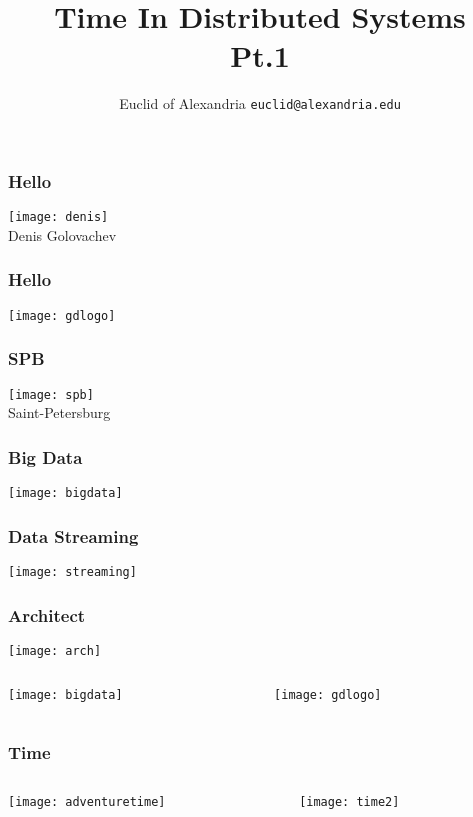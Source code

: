 \documentclass[aspectratio=169, 15pt,usenames,dvipsnames]{beamer}
\title{Time In Distributed Systems\\Pt.1}
\author[Euclid]{Euclid of Alexandria \texttt{euclid@alexandria.edu}}
\begin{document}
{   
	\begin{titlePage} 
		\titlepage        
	\end{titlePage}
		
	\begin{gdblank}
		\frametitle{Hello}
		\centering\texttt{[image: denis]}
		\\Denis Golovachev		
	\end{gdblank} 
	\begin{gdblank}
		\frametitle{Hello}
		\centering\texttt{[image: gdlogo]}
	\end{gdblank}
	\begin{gdblank}
		\frametitle{SPB}
		\centering\texttt{[image: spb]}
		\\Saint-Petersburg
	\end{gdblank}
	\begin{gdblank}
		\frametitle{Big Data}
		\centering\texttt{[image: bigdata]} 
	\end{gdblank}
	\begin{gdblank}
		\frametitle{Data Streaming}
		\centering\texttt{[image: streaming]} 
	\end{gdblank}
	\begin{gdblank}
		\frametitle{Architect}
		\centering\texttt{[image: arch]} 
	\end{gdblank}
	\begin{gdblank}
		\begin{columns}
			\begin{column}{0.5\textwidth}
				\centering\texttt{[image: bigdata]}
			\end{column}
			\pause 
			\begin{column}{0.5\textwidth}
				\centering\texttt{[image: gdlogo]}
			\end{column}
		\end{columns}        
	\end{gdblank}
	\begin{gdblank}
		\frametitle{Time} 
		\begin{columns}
			\begin{column}{0.5\textwidth}
				\centering\texttt{[image: adventuretime]} 
			\end{column}
			\pause 
			\begin{column}{0.5\textwidth}
				\centering\texttt{[image: time2]} 
			\end{column}
		\end{columns}            

\end{gdblank}}
\end{document}
